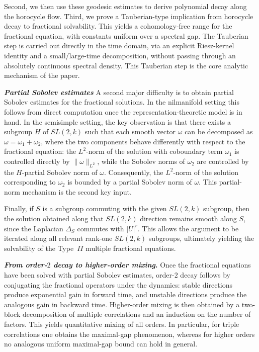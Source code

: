 \documentclass[11 pt]{amsart}
\theoremstyle{definition}
\numberwithin{equation}{section}
\begin{document}
Second, we then use these geodesic estimates to derive polynomial decay along the horocycle flow. Third, we prove a Tauberian-type implication from horocycle decay to fractional solvability. This yields a cohomology-free range for the fractional equation, with constants uniform over a spectral gap. The Tauberian step is carried out directly in the time domain, via an explicit Riesz-kernel identity and a small/large-time decomposition, without passing through an absolutely continuous spectral density. This Tauberian step is the core analytic mechanism of the paper.



\textbf{\emph{Partial Sobolev estimates}} A second major difficulty is to obtain partial Sobolev estimates for the fractional solutions. In the nilmanifold setting this follows from direct computation once the representation-theoretic model is in hand. In the semisimple setting, the key observation is that there exists a subgroup \(H\) of \(SL(2,k)\) such that each smooth vector \(\omega\) can be decomposed as $\omega=\omega_1+\omega_2$, where the two components behave differently with respect to the fractional equation: the \(L^2\)-norm of the solution with coboundary term \(\omega_1\) is controlled directly by \(\|\omega\|_{L^2}\), while the Sobolev norms of \(\omega_2\) are controlled by the \(H\)-partial Sobolev norm of \(\omega\). Consequently, the \(L^2\)-norm of the solution corresponding to \(\omega_2\) is bounded by a partial Sobolev norm of \(\omega\). This partial-norm mechanism is the second key input.

Finally, if \(S\) is a subgroup commuting with the given \(SL(2,k)\) subgroup, then the solution obtained along that \(SL(2,k)\) direction remains smooth along \(S\), since the Laplacian \(\Delta_S\) commutes with \( |U|^r \). This allows the argument to be iterated along all relevant rank-one \(SL(2,k)\) subgroups, ultimately yielding the solvability of the Type~$II$ multiple fractional equations.







\textbf{\emph{From order-$2$ decay to higher-order mixing}. }Once the fractional equations have been solved with partial Sobolev estimates, order-$2$ decay follows by conjugating the fractional operators under the dynamics: stable directions produce exponential gain in forward time, and unstable directions produce the analogous gain in backward time. Higher-order mixing is then obtained by a two-block decomposition of multiple correlations and an induction on the number of factors. This yields quantitative mixing of all orders. In particular, for triple correlations one obtains the maximal-gap phenomenon, whereas for higher orders no analogous uniform maximal-gap bound can hold in general.
\end{document}
